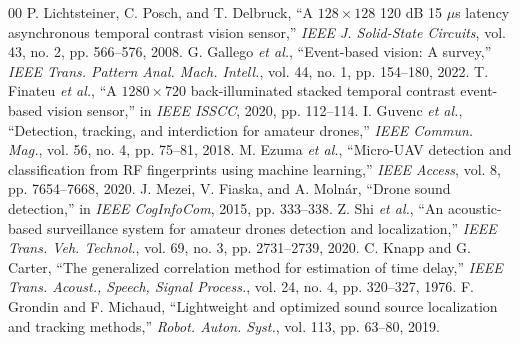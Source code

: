 \documentclass[conference]{IEEEtran}
\begin{document}
\begin{thebibliography}{00}
 P. Lichtsteiner, C. Posch, and T. Delbruck,
``A $128\times128$ 120 dB 15 $\mu$s latency asynchronous temporal contrast
vision sensor,'' \emph{IEEE J. Solid-State Circuits}, vol. 43, no. 2,
pp. 566--576, 2008.
 G. Gallego \emph{et al.}, ``Event-based vision: A
survey,'' \emph{IEEE Trans. Pattern Anal. Mach. Intell.}, vol. 44, no. 1,
pp. 154--180, 2022.
 T. Finateu \emph{et al.}, ``A $1280\times720$
back-illuminated stacked temporal contrast event-based vision sensor,'' in
\emph{IEEE ISSCC}, 2020, pp. 112--114.
 I. Guvenc \emph{et al.}, ``Detection, tracking, and
interdiction for amateur drones,'' \emph{IEEE Commun. Mag.}, vol. 56,
no. 4, pp. 75--81, 2018.
 M. Ezuma \emph{et al.}, ``Micro-UAV detection and
classification from RF fingerprints using machine learning,'' \emph{IEEE
Access}, vol. 8, pp. 7654--7668, 2020.
 J. Mezei, V. Fiaska, and A. Moln\'ar, ``Drone sound
detection,'' in \emph{IEEE CogInfoCom}, 2015, pp. 333--338.
 Z. Shi \emph{et al.}, ``An acoustic-based surveillance
system for amateur drones detection and localization,'' \emph{IEEE Trans.
Veh. Technol.}, vol. 69, no. 3, pp. 2731--2739, 2020.
 C. Knapp and G. Carter, ``The generalized correlation
method for estimation of time delay,'' \emph{IEEE Trans. Acoust., Speech,
Signal Process.}, vol. 24, no. 4, pp. 320--327, 1976.
 F. Grondin and F. Michaud, ``Lightweight and
optimized sound source localization and tracking methods,'' \emph{Robot.
Auton. Syst.}, vol. 113, pp. 63--80, 2019.
\end{thebibliography}
\end{document}

